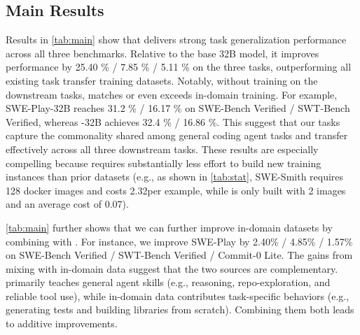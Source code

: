 \documentclass{article}
\theoremstyle{plain}
\theoremstyle{definition}
\theoremstyle{remark}
\begin{document}
\subsection{Main Results}
Results in \autoref{tab:main} show that \methodName delivers strong task generalization performance across all three benchmarks. Relative to the base 32B model, it improves performance by 25.40 \% / 7.85 \% / 5.11 \% on the three tasks, outperforming all existing task transfer training datasets.
Notably, without training on the downstream tasks, \methodName matches or even exceeds in-domain training. For example, SWE-Play-32B reaches 31.2 \% / 16.17 \% on SWE-Bench Verified / SWT-Bench Verified, whereas \methodName-32B achieves 32.4 \% / 16.86 \%. 
This suggest that our tasks capture the commonality shared among general coding agent tasks and transfer effectively across all three downstream tasks.
These results are especially compelling because \methodName requires substantially less effort to build new training instances than prior datasets (e.g., as shown in \autoref{tab:stat}, SWE-Smith requires 128 docker images and costs 2.32\textcent per example, while \methodName is only built with 2 images and an average cost of 0.07\textcent).


\autoref{tab:main} further shows that we can further improve in-domain datasets by combining with \methodName. For instance, we improve SWE-Play by 2.40\% / 4.85\% / 1.57\% on SWE-Bench Verified / SWT-Bench Verified / Commit-0 Lite.
The gains from mixing \methodName with in-domain data suggest that the two sources are complementary. \methodName primarily teaches general agent skills (e.g., reasoning, repo-exploration, and reliable tool use), while in-domain data contributes task-specific behaviors (e.g., generating tests and building libraries from scratch). Combining them both leads to additive improvements.
\end{document}
